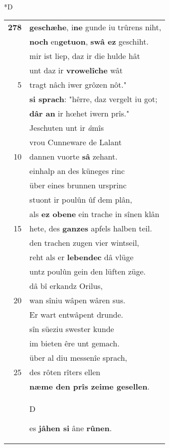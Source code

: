 \documentclass[8pt,a4paper,notitlepage]{article}
\begin{document}
\begin{table}[ht]
\begin{minipage}[t]{0.5\linewidth}
\small
\begin{center}*D
\end{center}
\begin{tabular}{rl}
\textbf{278} & \textbf{geschæhe}, i\textbf{ne} gunde iu trûrens niht,\\ 
 & \textbf{noch} en\textbf{getuon}, \textbf{swâ ez} geschiht.\\ 
 & mir ist liep, daz ir die hulde hât\\ 
 & unt daz ir \textbf{vrowelîche} wât\\ 
5 & tragt nâch iwer grôzen nôt."\\ 
 & \textbf{si sprach}: "hêrre, daz vergelt iu got;\\ 
 & \textbf{dâr an} ir hœhet iwern prîs."\\ 
 & Jeschuten unt ir \textit{â}mîs\\ 
 & vrou Cunneware de Lalant\\ 
10 & dannen vuorte \textbf{sâ} zehant.\\ 
 & einhalp an des küneges rinc\\ 
 & über eines brunnen ursprinc\\ 
 & stuont ir poulûn ûf dem plân,\\ 
 & als \textbf{ez obene} ein trache in sînen klân\\ 
15 & hete, des \textbf{ganzes} apfels halben teil.\\ 
 & den trachen zugen vier wintseil,\\ 
 & reht als er \textbf{lebendec} dâ vlüge\\ 
 & untz poulûn gein den lüften züge.\\ 
 & dâ bî erkandz Orilus,\\ 
20 & wan sîniu wâpen wâren sus.\\ 
 & Er wart entwâpent drunde.\\ 
 & sîn süeziu swester kunde\\ 
 & im bieten êre unt gemach.\\ 
 & über al diu messenîe sprach,\\ 
25 & des rôten rîters ellen\\ 
 & \textbf{næme den prîs zeime gesellen}.\\ 
 & \begin{large}D\end{large}es \textbf{jâhen si} âne \textbf{rûnen}.\\ 

\end{tabular}
\end{minipage}
\end{table}
\end{document}
